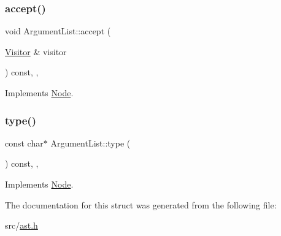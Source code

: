 \subsubsection{\texorpdfstring{accept()}{accept()}}
{\footnotesize\ttfamily void Argument\+List\+::accept (\begin{DoxyParamCaption}\item[{\hyperlink{struct_visitor}{Visitor} \&}]{visitor }\end{DoxyParamCaption}) const\hspace{0.3cm}{\ttfamily [inline]}, {\ttfamily [override]}, {\ttfamily [virtual]}}



Implements \hyperlink{struct_node_a10bd7af968140bbf5fa461298a969c71}{Node}.

\mbox{\label{struct_argument_list_a40d37153eb093deadf7045b1ad5ae1fa}} 
\subsubsection{\texorpdfstring{type()}{type()}}
{\footnotesize\ttfamily const char$\ast$ Argument\+List\+::type (\begin{DoxyParamCaption}{ }\end{DoxyParamCaption}) const\hspace{0.3cm}{\ttfamily [inline]}, {\ttfamily [override]}, {\ttfamily [virtual]}}



Implements \hyperlink{struct_node_a82f29420d0a38efcc370352528e94e9b}{Node}.



The documentation for this struct was generated from the following file\+:\begin{DoxyCompactItemize}
\item 
src/\hyperlink{ast_8h}{ast.\+h}\end{DoxyCompactItemize}
